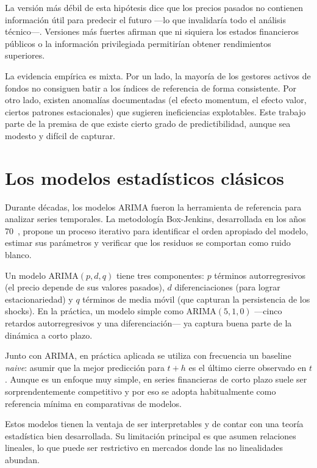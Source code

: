 La versión más débil de esta hipótesis dice que los precios pasados no contienen información útil para predecir el futuro ---lo que invalidaría todo el análisis técnico---. Versiones más fuertes afirman que ni siquiera los estados financieros públicos o la información privilegiada permitirían obtener rendimientos superiores.

La evidencia empírica es mixta. Por un lado, la mayoría de los gestores activos de fondos no consiguen batir a los índices de referencia de forma consistente. Por otro lado, existen anomalías documentadas (el efecto momentum, el efecto valor, ciertos patrones estacionales) que sugieren ineficiencias explotables. Este trabajo parte de la premisa de que existe cierto grado de predictibilidad, aunque sea modesto y difícil de capturar.

\section{Los modelos estadísticos clásicos}

Durante décadas, los modelos ARIMA fueron la herramienta de referencia para analizar series temporales. La metodología Box-Jenkins, desarrollada en los años 70~\cite{box2015time}, propone un proceso iterativo para identificar el orden apropiado del modelo, estimar sus parámetros y verificar que los residuos se comportan como ruido blanco.

Un modelo ARIMA$(p,d,q)$ tiene tres componentes: $p$ términos autorregresivos (el precio depende de sus valores pasados), $d$ diferenciaciones (para lograr estacionariedad) y $q$ términos de media móvil (que capturan la persistencia de los shocks). En la práctica, un modelo simple como ARIMA$(5,1,0)$ ---cinco retardos autorregresivos y una diferenciación--- ya captura buena parte de la dinámica a corto plazo.

Junto con ARIMA, en práctica aplicada se utiliza con frecuencia un baseline \emph{naive}: asumir que la mejor predicción para $t+h$ es el último cierre observado en $t$. Aunque es un enfoque muy simple, en series financieras de corto plazo suele ser sorprendentemente competitivo y por eso se adopta habitualmente como referencia mínima en comparativas de modelos.

Estos modelos tienen la ventaja de ser interpretables y de contar con una teoría estadística bien desarrollada. Su limitación principal es que asumen relaciones lineales, lo que puede ser restrictivo en mercados donde las no linealidades abundan.

